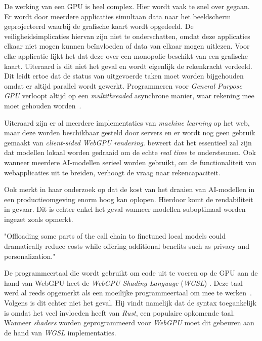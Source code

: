 \bigbreak{}

De werking van een GPU is heel complex. Hier wordt vaak te snel over gegaan. Er wordt door meerdere applicaties simultaan data naar het beeldscherm geprojecteerd waarbij de grafische kaart wordt opgedeeld. De veiligheidsimplicaties hiervan zijn niet te onderschatten, omdat deze applicaties elkaar niet mogen kunnen beïnvloeden of data van elkaar mogen uitlezen. Voor elke applicatie lijkt het dat deze over een monopolie beschikt van een grafische kaart. Uiteraard is dit niet het geval en wordt eigenlijk de rekenkracht verdeeld. Dit leidt ertoe dat de status van uitgevoerde taken moet worden bijgehouden omdat er altijd parallel wordt gewerkt. Programmeren voor \textit{General Purpose GPU} verloopt altijd op een \textit{multithreaded} asynchrone manier, waar rekening mee moet gehouden worden~\autocite{Surma2022}.

\bigbreak{}

Uiteraard zijn er al meerdere implementaties van \textit{machine learning} op het web, maar deze worden beschikbaar gesteld door servers en er wordt nog geen gebruik gemaakt van \textit{client-sided WebGPU rendering}. \textcite{Fleetwood2023a} beweert dat het essentieel zal zijn dat modellen lokaal worden gedraaid om de echte \textit{real time} te ondersteunen. Ook wanneer meerdere AI-modellen serieel worden gebruikt, om de functionaliteit van webapplicaties uit te breiden, verhoogt de vraag naar rekencapaciteit.

\bigbreak{}

Ook \textcite{Huyen2023} merkt in haar onderzoek op dat de kost van het draaien van AI-modellen in een productieomgeving enorm hoog kan oplopen. Hierdoor komt de rendabiliteit in gevaar. Dit is echter enkel het geval wanneer modellen suboptimaal worden ingezet zoals \textcite{Fleetwood2023a} opmerkt.

\begin{displayquote}
    "Offloading some parts of the call chain to finetuned local models could dramatically reduce costs while offering additional benefits such as privacy and personalization."
\end{displayquote}

\bigbreak{}

De programmeertaal die wordt gebruikt om code uit te voeren op de GPU aan de hand van WebGPU heet de \textit{WebGPU Shading Language} (\textit{WGSL}) \autocite{W3C2024}. Deze taal werd al reeds opgemerkt als een moeilijke programmeertaal om mee te werken~\autocite{Madrigal2023, Ashton2020}. Volgens \textcite{Fleetwood2023a} is dit echter niet het geval. Hij vindt namelijk dat de syntax toegankelijk is omdat het veel invloeden heeft van \textit{Rust}, een populaire opkomende taal. Wanneer \textit{shaders} worden geprogrammeerd voor \textit{WebGPU} moet dit gebeuren aan de hand van \textit{WGSL} implementaties.

